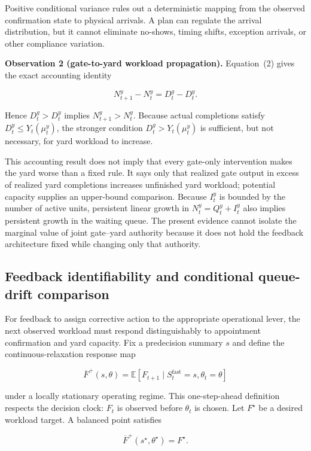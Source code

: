\documentclass[preprint,12pt,authoryear,a4paper]{elsarticle}
\begin{document}
Positive conditional variance rules out a deterministic mapping from the observed confirmation state to physical arrivals. A plan can regulate the arrival distribution, but it cannot eliminate no-shows, timing shifts, exception arrivals, or other compliance variation.

\noindent\textbf{Observation 2 (gate-to-yard workload propagation).} Equation~(2) gives the exact accounting identity

\[
N_{t+1}^y-N_t^y=D_t^g-D_t^y.
\tag{23}
\]

Hence \(D_t^g>D_t^y\) implies \(N_{t+1}^y>N_t^y\). Because actual completions satisfy \(D_t^y\le Y_t(\mu_t^y)\), the stronger condition \(D_t^g>Y_t(\mu_t^y)\) is sufficient, but not necessary, for yard workload to increase.

This accounting result does not imply that every gate-only intervention makes the yard worse than a fixed rule. It says only that realized gate output in excess of realized yard completions increases unfinished yard workload; potential capacity supplies an upper-bound comparison. Because \(I_t^y\) is bounded by the number of active units, persistent linear growth in \(N_t^y=Q_t^y+I_t^y\) also implies persistent growth in the waiting queue. The present evidence cannot isolate the marginal value of joint gate--yard authority because it does not hold the feedback architecture fixed while changing only that authority.

\subsection{Feedback identifiability and conditional queue-drift comparison}
\label{subsec:5-2-feedback-identifiability-and-queue-drift-correction}

For feedback to assign corrective action to the appropriate operational lever, the next observed workload must respond distinguishably to appointment confirmation and yard capacity. Fix a predecision summary \(s\) and define the continuous-relaxation response map

\[
\overline F^{+}(s,\theta)
=\mathbb E[F_{t+1}\mid S_t^{\mathrm{fast}}=s,\theta_t=\theta]
\]

under a locally stationary operating regime. This one-step-ahead definition respects the decision clock: \(F_t\) is observed before \(\theta_t\) is chosen. Let \(F^\star\) be a desired workload target. A balanced point satisfies

\[
\overline F^{+}(s^\star,\theta^\star)=F^\star.
\tag{24}
\]
\end{document}

